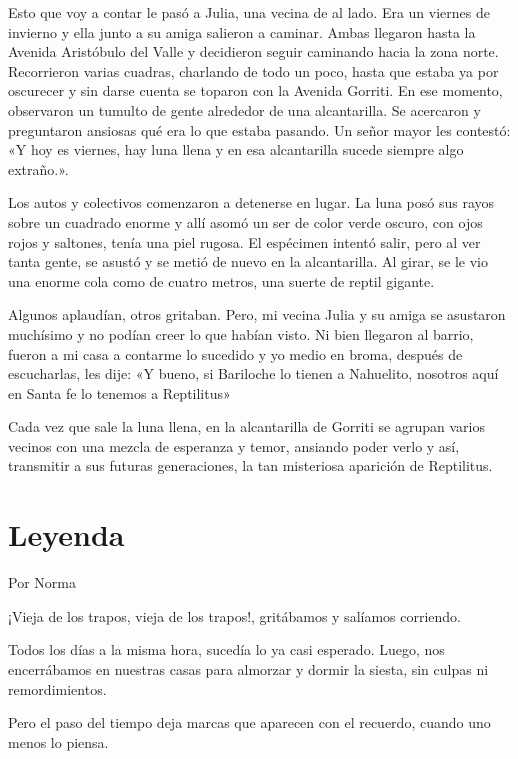 \documentclass[11pt,twoside,openright,a5paper]{book}
\begin{document}
Esto que voy a contar le pasó a Julia, una vecina de al lado. Era un viernes de invierno y ella junto a su amiga salieron a caminar. Ambas llegaron hasta la Avenida Aristóbulo del Valle y decidieron seguir caminando hacia la zona norte. Recorrieron varias cuadras, charlando de todo un poco, hasta que estaba ya por oscurecer y sin darse cuenta se toparon con la Avenida Gorriti. En ese momento, observaron un tumulto de gente alrededor de una alcantarilla. Se acercaron y preguntaron ansiosas qué era lo que estaba pasando. Un señor mayor les contestó: «Y hoy es viernes, hay luna llena y en esa alcantarilla sucede siempre algo extraño.».

Los autos y colectivos comenzaron a detenerse en lugar. La luna posó sus rayos sobre un cuadrado enorme y allí asomó un ser de color verde oscuro, con ojos rojos y saltones, tenía una piel rugosa. El espécimen intentó salir, pero al ver tanta gente, se asustó y se metió de nuevo en la alcantarilla. Al girar, se le vio una enorme cola como de cuatro metros, una suerte de reptil gigante.

Algunos aplaudían, otros gritaban. Pero, mi vecina Julia y su amiga se asustaron muchísimo y no podían creer lo que habían visto. Ni bien llegaron al barrio, fueron a mi casa a contarme lo sucedido y yo medio en broma, después de escucharlas, les dije: «Y bueno, si Bariloche lo tienen a Nahuelito, nosotros aquí en Santa fe lo tenemos a Reptilitus»

Cada vez que sale la luna llena, en la alcantarilla de Gorriti se agrupan varios vecinos con una mezcla de esperanza y temor, ansiando poder verlo y así, transmitir a sus futuras generaciones, la tan misteriosa aparición de Reptilitus.

\section*{Leyenda}

                                                                                                      \begin{flushright}Por Norma\end{flushright}

¡Vieja de los trapos, vieja de los trapos!, gritábamos y salíamos corriendo.

Todos los días a la misma hora, sucedía lo ya casi esperado. Luego, nos encerrábamos en nuestras casas para almorzar y dormir la siesta, sin culpas ni remordimientos.

Pero el paso del tiempo deja marcas que aparecen con el recuerdo, cuando uno menos lo piensa.
\end{document}
